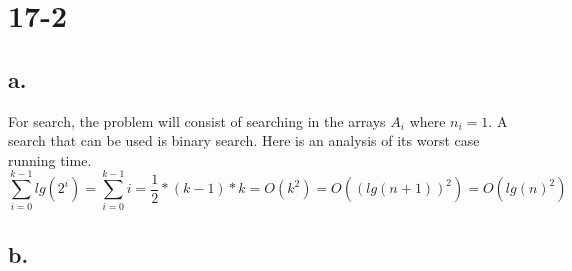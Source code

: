 \documentclass[12pt,a4paper]{report}
\begin{document}
\section*{17-2}
\subsection*{a.}
For search, the problem will consist of searching in the arrays $A_i$ where $n_i = 1$.
A search that can be used is binary search.
Here is an analysis of its worst case running time.
$$\sum\limits_{i=0}^{k-1} lg(2^i) = \sum\limits_{i=0}^{k-1} i = \frac{1}{2} * (k-1) * k = O(k^2) = O((lg(n+1))^2) = O(lg(n)^2)$$

\subsection*{b.} 
\end{document}
